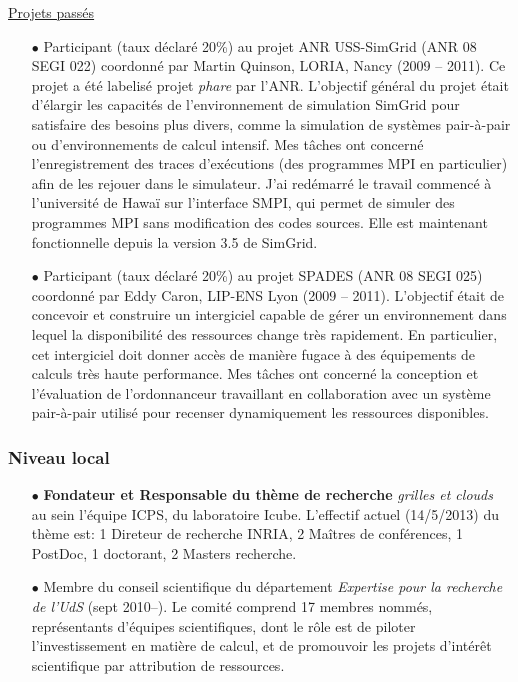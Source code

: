 \documentclass[11pt]{article}
\begin{document}
\underline{Projets passés}\\
\begin{itemize}
\item[$\bullet$]
Participant (taux déclaré 20\%) au projet ANR USS-SimGrid (ANR 08 SEGI 022) coordonné par 
Martin Quinson, LORIA, Nancy (2009 -- 2011). Ce projet a été labelisé projet \textit{phare}
par l'ANR.
L'objectif général du projet était  d'élargir les capacités 
de l'environnement de simulation SimGrid pour satisfaire des besoins plus divers, comme la
simulation de systèmes pair-à-pair ou d'environnements de calcul intensif.
Mes tâches ont concerné l'enregistrement des traces d'exécutions (des programmes MPI en 
particulier) afin de les rejouer dans le simulateur. J'ai redémarré
le travail commencé à l'université de Hawaï sur l'interface SMPI, qui permet de simuler des 
programmes MPI sans modification des codes sources. Elle est maintenant fonctionnelle depuis
la version 3.5 de SimGrid.\\


\item[$\bullet$]
Participant (taux déclaré 20\%) au projet SPADES (ANR 08 SEGI 025) coordonné par Eddy Caron, 
LIP-ENS Lyon (2009 -- 2011). L'objectif était de concevoir et construire un intergiciel capable 
de gérer un environnement dans lequel la disponibilité des ressources change très rapidement. 
En particulier, cet intergiciel doit donner accès de manière fugace à des équipements de calculs 
très haute performance. Mes tâches ont concerné la conception et l'évaluation de l'ordonnanceur
travaillant en collaboration avec un système pair-à-pair utilisé pour recenser dynamiquement
les ressources disponibles.\\
\end{itemize}

\subsubsection{Niveau local}
\begin{itemize}


\item[$\bullet$]  \textbf{Fondateur  et  Responsable   du  thème  de  recherche}
  \emph{grilles   et   clouds}   au   sein   l'équipe   ICPS,   du   laboratoire
  Icube. L'effectif  actuel (14/5/2013)  du thème est:  1 Direteur  de recherche
  INRIA, 2 Maîtres de conférences, 1 PostDoc, 1 doctorant, 2 Masters recherche.
 
\item [$\bullet$]
Membre du conseil scientifique du département \emph{Expertise pour la recherche de l'UdS} (sept 2010--).
Le comité comprend 17 membres nommés, représentants d'équipes scientifiques, dont le rôle
est de piloter l'investissement en matière de calcul, et de promouvoir les projets 
d'intérêt scientifique par attribution de ressources.\\
\end{itemize}
\end{document}

